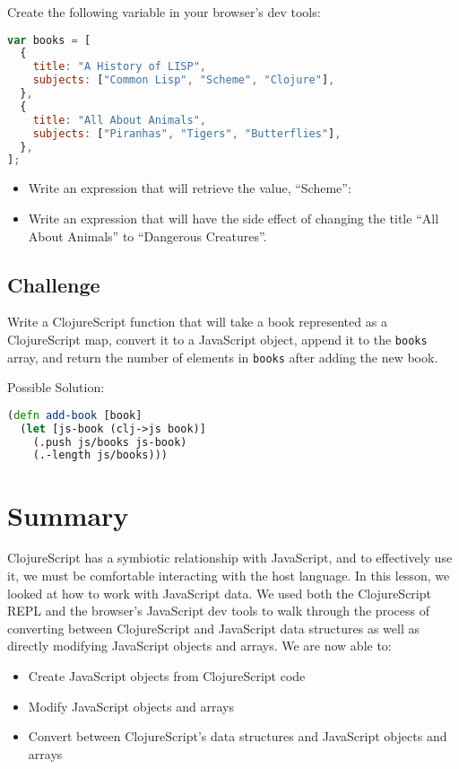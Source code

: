 \documentclass[10pt,twoside,openright]{memoir}
\begin{document}
Create the following variable in your browser's dev tools:

\begin{lstlisting}[language=JavaScript]
var books = [
  {
    title: "A History of LISP",
    subjects: ["Common Lisp", "Scheme", "Clojure"],
  },
  {
    title: "All About Animals",
    subjects: ["Piranhas", "Tigers", "Butterflies"],
  },
];
\end{lstlisting}

\begin{itemize}
\tightlist
\item
  Write an expression that will retrieve the value, ``Scheme'':
\item
  Write an expression that will have the side effect of changing the
  title ``All About Animals'' to ``Dangerous Creatures''.
\end{itemize}


\subsection{Challenge}

Write a ClojureScript function that will take a book represented as a
ClojureScript map, convert it to a JavaScript object, append it to the
\texttt{books} array, and return the number of elements in
\texttt{books} after adding the new book.

Possible Solution:

\begin{lstlisting}[language=Clojure]
(defn add-book [book]
  (let [js-book (clj->js book)]
    (.push js/books js-book)
    (.-length js/books)))
\end{lstlisting}

\section{Summary}

ClojureScript has a symbiotic relationship with JavaScript, and to
effectively use it, we must be comfortable interacting with the host
language. In this lesson, we looked at how to work with JavaScript data.
We used both the ClojureScript REPL and the browser's JavaScript dev
tools to walk through the process of converting between ClojureScript
and JavaScript data structures as well as directly modifying JavaScript
objects and arrays. We are now able to:

\begin{itemize}
\tightlist
\item
  Create JavaScript objects from ClojureScript code
\item
  Modify JavaScript objects and arrays
\item
  Convert between ClojureScript's data structures and JavaScript objects
  and arrays
\end{itemize}
\end{document}
